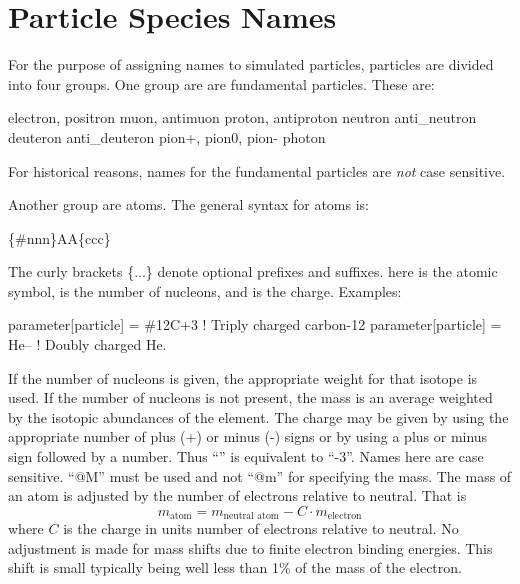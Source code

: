{{{{{\section{Particle Species Names}
\label{s:species.name}

For the purpose of assigning names to simulated particles, particles are divided into four
groups. One group are are fundamental particles. These are:
\begin{example}
  electron,  positron
  muon,      antimuon
  proton,    antiproton
  neutron    anti_neutron
  deuteron   anti_deuteron
  pion+,     pion0,      pion-
  photon
\end{example}
For historical reasons, names for the fundamental particles are {\em not} case sensitive.

Another group are atoms. The general syntax for atoms is:
\begin{example}
  \{\#nnn\}AA\{ccc\}
\end{example}
The curly brackets \{...\} denote optional prefixes and suffixes.  here is the
atomic symbol,  is the number of nucleons, and  is the charge. Examples:
\begin{example}
  parameter[particle] = \#12C+3       ! Triply charged carbon-12
  parameter[particle] = He--          ! Doubly charged He.
\end{example}
If the number of nucleons is given, the appropriate weight for that isotope is used. If the number
of nucleons is not present, the mass is an average weighted by the isotopic abundances of the
element. The charge may be given by using the appropriate number of plus (+) or minus (-) signs or
by using a plus or minus sign followed by a number. Thus ``\vn{-{-}-}'' is equivalent to
``-3''. Names here are case sensitive. ``@M'' must be used and not ``@m'' for specifying the mass.
The mass of an atom is adjusted by the number of electrons relative to neutral. That is
\begin{equation}
  m_{\mbox{atom}} = m_{\mbox{neutral atom}} - C \cdot m_{\mbox{electron}}
\end{equation}
where $C$ is the charge in units number of electrons relative to neutral. No adjustment is made for
mass shifts due to finite electron binding energies. This shift is small typically being well less
than 1\% of the mass of the electron.

}}}}}
